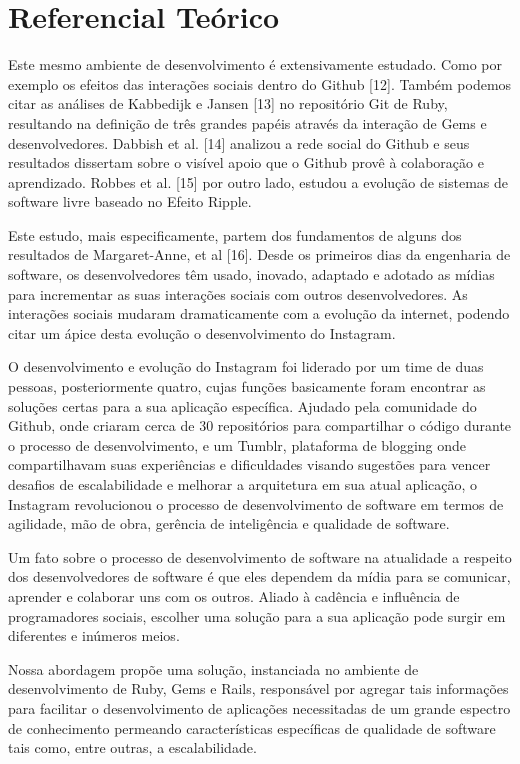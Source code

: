 \chapter{Referencial Teórico}

Este mesmo ambiente de desenvolvimento é extensivamente estudado. Como por exemplo os efeitos das interações sociais dentro do Github [12]. Também podemos citar as análises de Kabbedijk e Jansen [13] no repositório Git de Ruby, resultando na definição de três grandes papéis através da interação de Gems e desenvolvedores. Dabbish et al. [14] analizou a rede social do Github e seus resultados dissertam sobre o visível apoio que o Github provê à colaboração e aprendizado. Robbes et al. [15] por outro lado, estudou a evolução de sistemas de software livre baseado no Efeito Ripple.

Este estudo, mais especificamente, partem dos fundamentos de alguns dos resultados de Margaret-Anne, et al [16]. Desde os primeiros dias da engenharia de software, os desenvolvedores têm usado, inovado, adaptado e adotado as mídias para incrementar as suas interações sociais com outros desenvolvedores. As interações sociais mudaram dramaticamente com a evolução da internet, podendo citar um ápice desta evolução o desenvolvimento do Instagram.

O desenvolvimento e evolução do Instagram foi liderado por um time de duas pessoas, posteriormente quatro, cujas funções basicamente foram encontrar as soluções certas para a sua aplicação específica. Ajudado pela comunidade do Github, onde criaram cerca de 30 repositórios para compartilhar o código durante o processo de desenvolvimento, e um Tumblr, plataforma de blogging onde compartilhavam suas experiências e dificuldades visando sugestões para vencer desafios de escalabilidade e melhorar a arquitetura em sua atual aplicação, o Instagram revolucionou o processo de desenvolvimento de software em termos de agilidade, mão de obra, gerência de inteligência e qualidade de software.

Um fato sobre o processo de desenvolvimento de software na atualidade a respeito dos desenvolvedores de software é que eles dependem da mídia para se comunicar, aprender e colaborar uns com os outros. Aliado à cadência e influência de programadores sociais, escolher uma solução para a sua aplicação pode surgir em diferentes e inúmeros meios.

Nossa abordagem propõe uma solução, instanciada no ambiente de desenvolvimento de Ruby, Gems e Rails, responsável por agregar tais informações para facilitar o desenvolvimento de aplicações necessitadas de um grande espectro de conhecimento permeando características específicas de qualidade de software tais como, entre outras, a escalabilidade.

